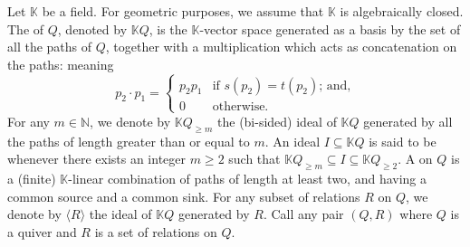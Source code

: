 Let $\mathbb{K}$ be a field. For geometric purposes, we assume that $\mathbb{K}$ is algebraically closed. The  of $Q$, denoted by $\mathbb{K}Q$, is the $\mathbb{K}$-vector space generated as a basis by the set of all the paths of $Q$, together with a multiplication which acts as concatenation on the paths: meaning \[p_2 \cdot p_1 = \begin{cases}
    p_2p_1 & \text{if } s(p_2) = t(p_2) \text{; and,} \\
    0 & \text{otherwise.}
\end{cases}\] For any $m \in \mathbb{N}$, we denote by $\mathbb{K}Q_{\geqslant m}$ the (bi-sided) ideal of $\mathbb{K}Q$ generated by all the paths of length greater than or equal to $m$. An ideal $I \subseteq \mathbb{K}Q$ is said to be  whenever there exists an integer $m \geqslant 2$ such that $\mathbb{K}Q_{\geqslant m} \subseteq  I \subseteq \mathbb{K} Q_{\geqslant 2}$. A  on $Q$ is a (finite) $\mathbb{K}$-linear combination of paths of length at least two, and having a common source and a common sink. For any subset of relations $R$ on $Q$, we denote by $\langle R \rangle$ the ideal of $\mathbb{K}Q$ generated by $R$. Call  any pair $(Q,R)$ where $Q$ is a quiver and $R$ is a set of relations on $Q$.

